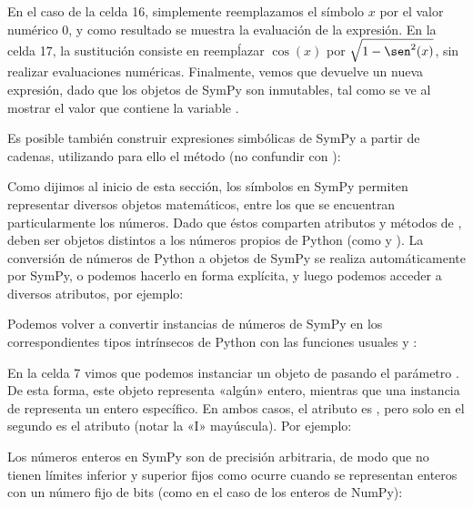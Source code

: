 
En el caso de la celda 16, simplemente reemplazamos el símbolo $x$ por el valor numérico $0$, y como resultado se muestra la evaluación de la expresión. En la celda 17, la sustitución consiste en reempĺazar $\cos(x)$ por $\sqrt{1 - \sen^2(x)}$, sin realizar evaluaciones numéricas. Finalmente, vemos que  devuelve un nueva expresión, dado que los objetos de SymPy son inmutables, tal como se ve al mostrar el valor que contiene la variable . 

Es posible también construir expresiones simbólicas de SymPy a partir de cadenas, utilizando para ello el método  (no confundir con ):


Como dijimos al inicio de esta sección, los símbolos en SymPy permiten representar diversos objetos matemáticos, entre los que se encuentran particularmente los números. Dado que éstos comparten atributos y métodos de , deben ser objetos distintos a los números propios de Python (como  y ). La conversión de números de Python a objetos de SymPy se realiza automáticamente por SymPy, o podemos hacerlo en forma explícita, y luego podemos acceder a diversos atributos, por ejemplo:


Podemos volver a convertir instancias de números de SymPy en los correspondientes tipos intrínsecos de Python con las funciones usuales  y :


En la celda 7 vimos que podemos instanciar un objeto de  pasando el parámetro . De esta forma, este objeto representa «algún» entero, mientras que una instancia de  representa un entero específico. En ambos casos, el atributo  es , pero solo en el segundo es  el atributo  (notar la «I» mayúscula). Por ejemplo:


Los números enteros en SymPy son de precisión arbitraria, de modo que no tienen límites inferior y superior fijos como ocurre cuando se representan enteros con un número fijo de bits (como en el caso de los enteros de NumPy):

